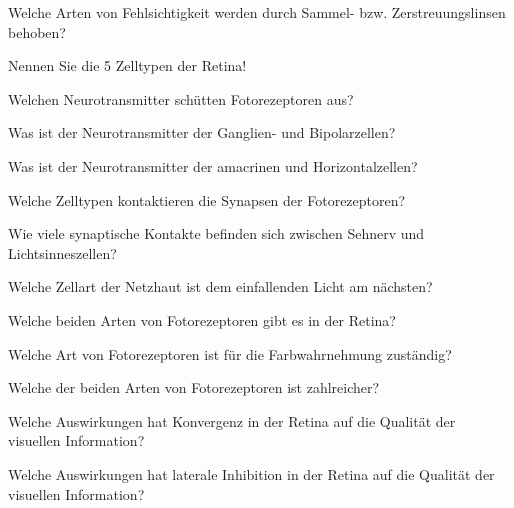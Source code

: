\documentclass[10pt, a4paper]{exam}
\begin{document}
\begin{questions}
  \begin{solution}
  \end{solution}
  \question Welche Arten von Fehlsichtigkeit werden durch Sammel- bzw. Zerstreuungslinsen behoben?
  \begin{solution}
  \end{solution}
  \question Nennen Sie die 5 Zelltypen der Retina!
  \begin{solution}
  \end{solution}
  \question Welchen Neurotransmitter schütten Fotorezeptoren aus?
  \begin{solution}
  \end{solution}
  \question Was ist der Neurotransmitter der Ganglien- und Bipolarzellen?
  \begin{solution}
  \end{solution}
  \question Was ist der Neurotransmitter der amacrinen und Horizontalzellen?
  \begin{solution}
  \end{solution}
  \question Welche Zelltypen kontaktieren die Synapsen der Fotorezeptoren?
  \begin{solution}
  \end{solution}
  \question Wie viele synaptische Kontakte befinden sich zwischen Sehnerv und Lichtsinneszellen?
  \begin{solution}
  \end{solution}
  \question Welche Zellart der Netzhaut ist dem einfallenden Licht am nächsten?
  \begin{solution}
  \end{solution}
  \question Welche beiden Arten von Fotorezeptoren gibt es in der Retina?
  \begin{solution}
  \end{solution}
  \question Welche Art von Fotorezeptoren ist für die Farbwahrnehmung zuständig?
  \begin{solution}
  \end{solution}
  \question Welche der beiden Arten von Fotorezeptoren ist zahlreicher?
  \begin{solution}
  \end{solution}
  \question Welche Auswirkungen hat Konvergenz in der Retina auf die Qualität der visuellen Information?
  \begin{solution}
  \end{solution}
  \question Welche Auswirkungen hat laterale Inhibition in der Retina auf die Qualität der visuellen Information?
  \begin{solution}

\end{solution}
\end{questions}
\end{document}
